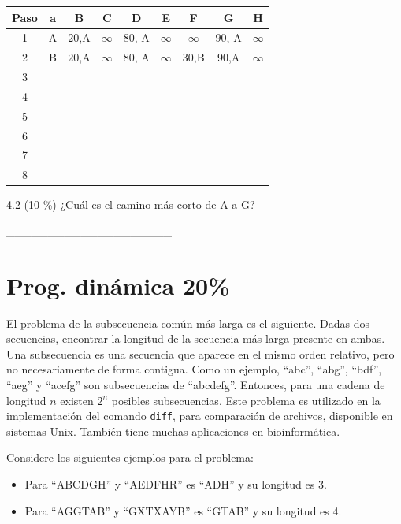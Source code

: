 \documentclass[twocolumn]{article}
\begin{document}
{\footnotesize
\begin{center}
\begin{tabular}{| c | c | c | c | c | c | c | c | c |}
\hline
Paso  & a & B & C & D & E & F & G & H \\
\hline
1 &  A  & $20$,A  & $\infty$  & $80$, A  & $\infty$   & $\infty$  & $90$, A  & $\infty$  \\
\hline
2 &  B  & $20$,A  &  $\infty$  & $80$, A  & $\infty$  & $30$,B  & $90$,A   & $\infty$  \\
\hline
3 &   &   &   &   &   &   &   &   \\
\hline
4 &   &   &   &   &   &   &   &   \\
\hline
5 &   &   &   &   &   &   &   &   \\
\hline
6 &   &   &   &   &   &   &   &   \\
\hline
7 &   &   &   &   &   &   &   &   \\ 
\hline
8 &   &   &   &   &   &   &   &   \\ 
\hline
\end{tabular}
\end{center}
}

4.2 (10 \%) ¿Cuál es el camino más corto de A a G?

  \_\_\_\_\_\_\_\_\_\_\_\_\_\_\_\_\_\_\_\_


\section{Prog. dinámica 20\%}
El problema de la subsecuencia común más larga es el siguiente. Dadas dos secuencias, encontrar la longitud de la secuencia más larga presente en ambas.
Una subsecuencia es una secuencia que aparece en el mismo orden relativo, pero no necesariamente de forma contigua. Como un ejemplo, ``abc'', ``abg'', ``bdf'',
``aeg'' y ``acefg'' son subsecuencias de ``abcdefg''. Entonces, para una cadena de longitud $n$ existen $2^n$ posibles subsecuencias. Este problema es utilizado
en la implementación del comando \texttt{diff}, para comparación de archivos, disponible en sistemas Unix.  También tiene muchas aplicaciones en bioinformática.

\noindent
Considere los siguientes ejemplos para el problema:
\begin{itemize}
\item Para ``ABCDGH'' y ``AEDFHR'' es ``ADH'' y su longitud es 3.
\item Para ``AGGTAB'' y ``GXTXAYB'' es ``GTAB'' y su longitud es 4.
\end{itemize}
\end{document}
